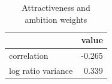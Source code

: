 \begin{table}[htbp]
\centering
\caption{Attractiveness and ambition weights}
\label{tab:q4_attractive_ambitious}
\begin{tabular}{lr}
\toprule
 & value \\
\midrule
correlation & -0.265 \\
log ratio variance & 0.339 \\
\bottomrule
\end{tabular}
\end{table}
